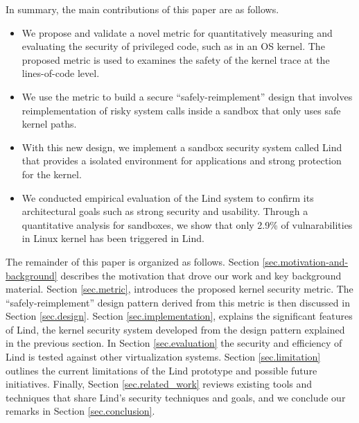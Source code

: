 In summary, 
the main contributions of this paper are as follows. %
\begin{itemize}
\item
We propose and validate a novel metric for quantitatively measuring and
evaluating the security of privileged code, such as in an OS kernel.
The proposed metric is used to examines the safety of the kernel trace at the lines-of-code level.


\item
We use the metric to build a secure ``safely-reimplement'' design that
involves reimplementation of risky system calls inside a
sandbox that only uses safe kernel paths.

\item
With this new design, we implement a sandbox security system called Lind
that provides a isolated environment for applications and strong protection for the kernel.

\item 
We conducted empirical evaluation of the Lind system to confirm its architectural goals such as strong security and usability. 
Through a quantitative analysis for sandboxes, we show that only 2.9\% of vulnarabilities in Linux kernel has been triggered in Lind.


\end{itemize}

The remainder of this paper is organized as follows.
Section \ref{sec.motivation-and-background} describes the motivation that drove our work and key background material.
Section \ref{sec.metric}, introduces the proposed kernel security metric. The
``safely-reimplement'' design pattern derived from this metric is then discussed in Section \ref{sec.design}. Section \ref{sec.implementation},
explains the significant features of Lind, the kernel security system developed
from the design pattern explained in the previous section. In Section \ref{sec.evaluation} the security and 
efficiency of Lind is tested against other virtualization systems. 
Section \ref{sec.limitation} outlines the current
limitations of the Lind prototype and possible future initiatives.
Finally, Section \ref{sec.related_work} reviews existing tools and techniques that share
Lind's security techniques and goals, and we conclude our remarks in
Section \ref{sec.conclusion}.